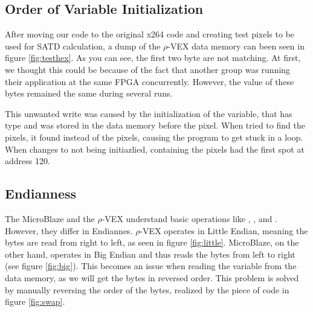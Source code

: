 \subsection{Order of Variable Initialization}

After moving our code to the original x264 code and creating test pixels to be used for SATD calculation, a dump of the $\rho$-VEX data memory can been seen in figure \ref{fig:testhex}. As you can see, the first two byte are not matching. At first, we thought this could be because of the fact that another group was running their application at the same FPGA concurrently. However, the value of these bytes remained the same during several runs. 

This unwanted write was caused by the initialization of the  variable, that has type  and was stored in the data memory before the pixel. When  tried to find the pixels, it found  instead of the pixels, causing the program to get stuck in a loop. When changes  to not being initiazlied,  containing the pixels had the first spot at address 120.

\subsection{Endianness}
The MicroBlaze and the $\rho$-VEX understand basic operations like , ,  and . However, they differ in Endiannes. $\rho$-VEX operates in Little Endian, meaning the bytes are read from right to left, as seen in figure \ref{fig:little}. MicroBlaze, on the other hand, operates in Big Endian and thus reads the bytes from left to right (see figure \ref{fig:big}). This becomes an issue when reading the  variable from the data memory, as we will get the bytes in reversed order. This problem is solved by manually reversing the order of the  bytes, realized by the piece of code in figure \ref{fig:swap}.

